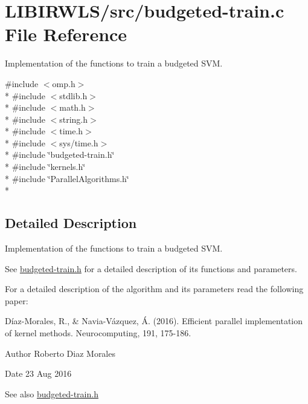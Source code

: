 \hypertarget{budgeted-train_8c}{}\section{L\+I\+B\+I\+R\+W\+L\+S/src/budgeted-\/train.c File Reference}
\label{budgeted-train_8c}


Implementation of the functions to train a budgeted S\+VM.  


{\ttfamily \#include $<$omp.\+h$>$}\\*
{\ttfamily \#include $<$stdlib.\+h$>$}\\*
{\ttfamily \#include $<$math.\+h$>$}\\*
{\ttfamily \#include $<$string.\+h$>$}\\*
{\ttfamily \#include $<$time.\+h$>$}\\*
{\ttfamily \#include $<$sys/time.\+h$>$}\\*
{\ttfamily \#include \char`\"{}budgeted-\/train.\+h\char`\"{}}\\*
{\ttfamily \#include \char`\"{}kernels.\+h\char`\"{}}\\*
{\ttfamily \#include \char`\"{}Parallel\+Algorithms.\+h\char`\"{}}\\*


\subsection{Detailed Description}
Implementation of the functions to train a budgeted S\+VM. 

See \hyperlink{budgeted-train_8h}{budgeted-\/train.\+h} for a detailed description of its functions and parameters.

For a detailed description of the algorithm and its parameters read the following paper\+:

Díaz-\/\+Morales, R., \& Navia-\/\+Vázquez, Á. (2016). Efficient parallel implementation of kernel methods. Neurocomputing, 191, 175-\/186.

\begin{DoxyAuthor}{Author}
Roberto Diaz Morales 
\end{DoxyAuthor}
\begin{DoxyDate}{Date}
23 Aug 2016 
\end{DoxyDate}
\begin{DoxySeeAlso}{See also}
\hyperlink{budgeted-train_8h}{budgeted-\/train.\+h} 
\end{DoxySeeAlso}
